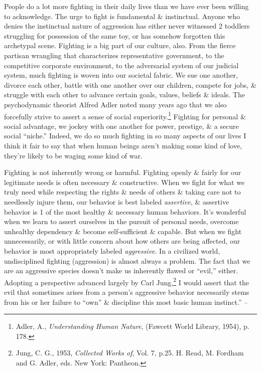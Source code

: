 \documentclass{article}
\numberwithin{equation}{section}
\begin{document}
People do a lot more fighting in their daily lives than we have ever been willing to acknowledge. The urge to fight is fundamental \& instinctual. Anyone who denies the instinctual nature of aggression has either never witnessed 2 toddlers struggling for possession of the same toy, or has somehow forgotten this archetypal scene. Fighting is a big part of our culture, also. From the fierce partisan wrangling that characterizes representative government, to the competitive corporate environment, to the adversarial system of our judicial system, much fighting is woven into our societal fabric. We sue one another, divorce each other, battle with one another over our children, compete for jobs, \& struggle with each other to advance certain goals, values, beliefs \& ideals. The psychodynamic theorist Alfred Adler noted many years ago that we also forcefully strive to assert a sense of social superiority.\footnote{Adler, A., \textit{Understanding Human Nature}, (Fawcett World Library, 1954), p. 178.} Fighting for personal \& social advantage, we jockey with one another for power, prestige, \& a secure social ``niche.'' Indeed, we do so much fighting in so many aspects of our lives I think it fair to say that when human beings aren't making some kind of love, they're likely to be waging some kind of war.

Fighting is not inherently wrong or harmful. Fighting openly \& fairly for our legitimate needs is often necessary \& constructive. When we fight for what we truly need while respecting the rights \& needs of others \& taking care not to needlessly injure them, our behavior is best labeled \textit{assertive}, \& assertive behavior is 1 of the most healthy \& necessary human behaviors. It's wonderful when we learn to assert ourselves in the pursuit of personal needs, overcome unhealthy dependency \& become self-sufficient \& capable. But when we fight unnecessarily, or with little concern about how others are being affected, our behavior is most appropriately labeled \textit{aggressive}. In a civilized world, undisciplined fighting (aggression) is almost always a problem. The fact that we are an aggressive species doesn't make us inherently flawed or ``evil,'' either. Adopting a perspective advanced largely by Carl Jung,\footnote{Jung, C. G., 1953, \textit{Collected Works of}, Vol. 7, p.25. H. Read, M. Fordham and G. Adler, eds. New York: Pantheon.} I would assert that the evil that sometimes arises from a person's aggressive behavior necessarily stems from his or her failure to ``own'' \& discipline this most basic human instinct.'' -- \cite[pp. 18--20]{Simon2010}
\end{document}
